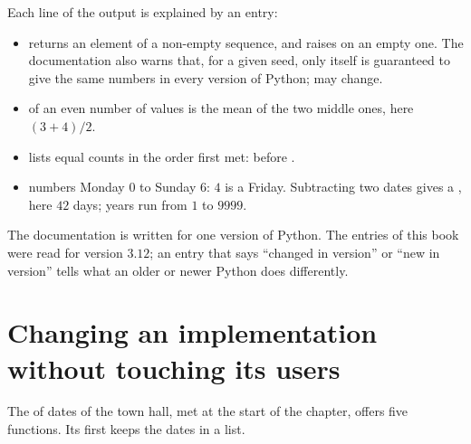 \label{lst:g11:modules-and-interfaces:stdlib}

\label{out:g11:modules-and-interfaces:stdlib}

Each line of the output is explained by an entry:
\begin{itemize}
  \item {} returns an element of a non-empty sequence, and raises  on an empty one.
    The documentation also warns that, for a given seed, only  itself is guaranteed to give the same
    numbers in every version of Python;  may change.
  \item {} of an even number of values is the mean of the two middle ones, here $(3 + 4) / 2$.
  \item {} lists equal counts in the order first met:  before .
  \item {} numbers Monday $0$ to Sunday $6$: $4$ is a Friday. Subtracting two dates gives a
    , here $42$ days; years run from $1$ to $9999$.
\end{itemize}

\begin{remark}
The documentation is written for one version of Python. The entries of this book were read for version $3.12$; an
entry that says ``changed in version'' or ``new in version'' tells what an older or newer Python does differently.
\end{remark}

\section{Changing an implementation without touching its users}\label{sec:g11:modules-and-interfaces:change}

The  of dates of the town hall, met at the start of the chapter, offers five functions. Its first  keeps the dates in a list.

